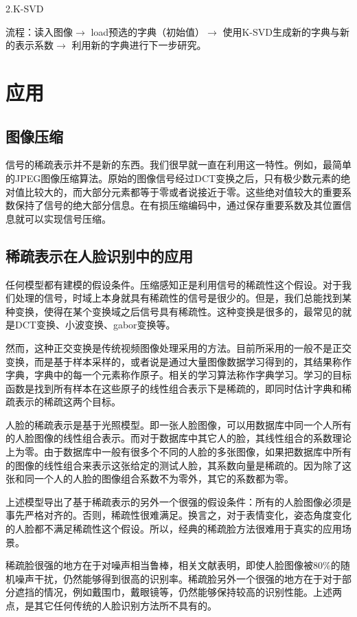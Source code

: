 \documentclass[a4paper,12pt]{article}
\begin{document}
2.K-SVD

流程：读入图像$\to$ load预选的字典（初始值）$\to$ 使用K-SVD生成新的字典与新的表示系数$\to$ 利用新的字典进行下一步研究。

\section{应用}

\subsection{图像压缩}

信号的稀疏表示并不是新的东西。我们很早就一直在利用这一特性。例如，最简单的JPEG图像压缩算法。原始的图像信号经过DCT变换之后，只有极少数元素的绝对值比较大的，而大部分元素都等于零或者说接近于零。这些绝对值较大的重要系数保持了信号的绝大部分信息。在有损压缩编码中，通过保存重要系数及其位置信息就可以实现信号压缩。

\subsection{稀疏表示在人脸识别中的应用}

任何模型都有建模的假设条件。压缩感知正是利用信号的稀疏性这个假设。对于我们处理的信号，时域上本身就具有稀疏性的信号是很少的。但是，我们总能找到某种变换，使得在某个变换域之后信号具有稀疏性。这种变换是很多的，最常见的就是DCT变换、小波变换、gabor变换等。

然而，这种正交变换是传统视频图像处理采用的方法。目前所采用的一般不是正交变换，而是基于样本采样的，或者说是通过大量图像数据学习得到的，其结果称作字典，字典中的每一个元素称作原子。相关的学习算法称作字典学习。学习的目标函数是找到所有样本在这些原子的线性组合表示下是稀疏的，即同时估计字典和稀疏表示的稀疏这两个目标。

人脸的稀疏表示是基于光照模型。即一张人脸图像，可以用数据库中同一个人所有的人脸图像的线性组合表示。而对于数据库中其它人的脸，其线性组合的系数理论上为零。由于数据库中一般有很多个不同的人脸的多张图像，如果把数据库中所有的图像的线性组合来表示这张给定的测试人脸，其系数向量是稀疏的。因为除了这张和同一个人的人脸的图像组合系数不为零外，其它的系数都为零。

上述模型导出了基于稀疏表示的另外一个很强的假设条件：所有的人脸图像必须是事先严格对齐的。否则，稀疏性很难满足。换言之，对于表情变化，姿态角度变化的人脸都不满足稀疏性这个假设。所以，经典的稀疏脸方法很难用于真实的应用场景。

稀疏脸很强的地方在于对噪声相当鲁棒，相关文献表明，即使人脸图像被80\%的随机噪声干扰，仍然能够得到很高的识别率。稀疏脸另外一个很强的地方在于对于部分遮挡的情况，例如戴围巾，戴眼镜等，仍然能够保持较高的识别性能。上述两点，是其它任何传统的人脸识别方法所不具有的。
\end{document}

